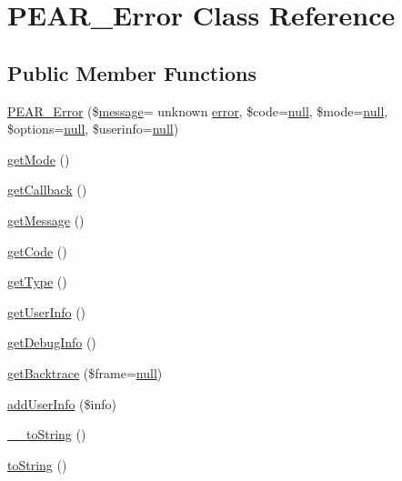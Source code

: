 \hypertarget{classPEAR__Error}{}\section{P\+E\+A\+R\+\_\+\+Error Class Reference}
\label{classPEAR__Error}
\subsection*{Public Member Functions}
\begin{DoxyCompactItemize}
\item 
\hyperlink{classPEAR__Error_a4df056a45879501a8b563c896fe608a3}{P\+E\+A\+R\+\_\+\+Error} (\$\hyperlink{classmessage}{message}= \textquotesingle{}unknown \hyperlink{jquery_8js_ad9c7b7332a24ed93fb21cd053c99bd12}{error}\textquotesingle{}, \$code=\hyperlink{modernizr_8min_8js_a286f9ec831c5e676eeb493248eab9575}{null}, \$mode=\hyperlink{modernizr_8min_8js_a286f9ec831c5e676eeb493248eab9575}{null}, \$options=\hyperlink{modernizr_8min_8js_a286f9ec831c5e676eeb493248eab9575}{null}, \$userinfo=\hyperlink{modernizr_8min_8js_a286f9ec831c5e676eeb493248eab9575}{null})
\item 
\hyperlink{classPEAR__Error_adf8ebb12d192a152c0f3f80b5ca01e7c}{get\+Mode} ()
\item 
\hyperlink{classPEAR__Error_a8060f0ee49b7346e4ca6e04aa70ae25c}{get\+Callback} ()
\item 
\hyperlink{classPEAR__Error_a00beb48b680580de68477d0f77e27510}{get\+Message} ()
\item 
\hyperlink{classPEAR__Error_a54924b41ab0d14ed7007f3c1b3f0ca82}{get\+Code} ()
\item 
\hyperlink{classPEAR__Error_acebd26397af611328c6a7125cbc6284b}{get\+Type} ()
\item 
\hyperlink{classPEAR__Error_a3933a88dc76b37aace3c333ce91f8560}{get\+User\+Info} ()
\item 
\hyperlink{classPEAR__Error_a33eade09a689fdb4e5a79727fa407f13}{get\+Debug\+Info} ()
\item 
\hyperlink{classPEAR__Error_a7892a046070c977e5fcba9fcb749673d}{get\+Backtrace} (\$frame=\hyperlink{modernizr_8min_8js_a286f9ec831c5e676eeb493248eab9575}{null})
\item 
\hyperlink{classPEAR__Error_a229db64a10b64f41644ec19cf3c1e47b}{add\+User\+Info} (\$info)
\item 
\hyperlink{classPEAR__Error_a82c4bf3c440d5b8663b214d799d08d74}{\+\_\+\+\_\+to\+String} ()
\item 
\hyperlink{classPEAR__Error_ae1b052b3d6ae9b74dbc3d348f894b6d2}{to\+String} ()
\end{DoxyCompactItemize}

